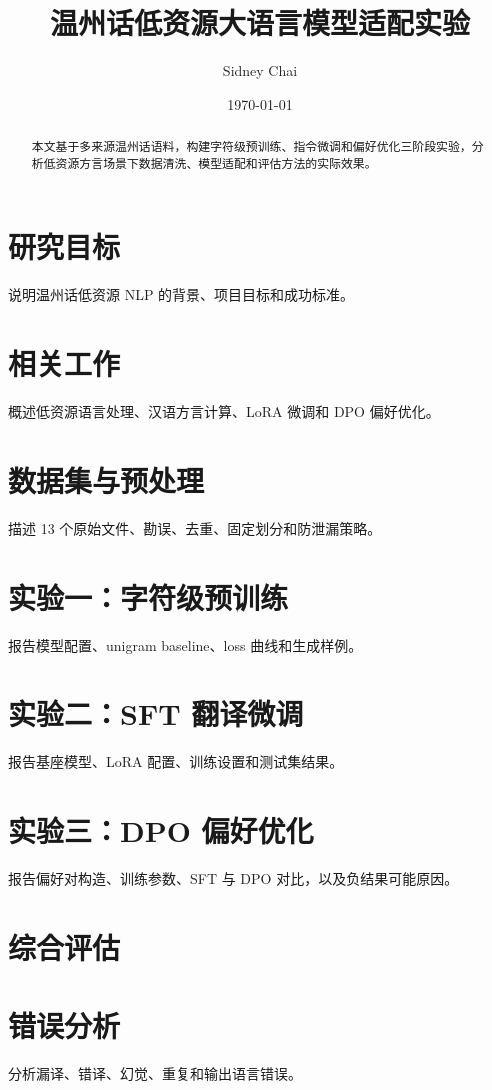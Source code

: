 \documentclass[UTF8,twocolumn]{ctexart}
\title{温州话低资源大语言模型适配实验}
\author{Sidney Chai}
\date{\today}
\begin{document}
\maketitle

\begin{abstract}
本文基于多来源温州话语料，构建字符级预训练、指令微调和偏好优化三阶段实验，分析低资源方言场景下数据清洗、模型适配和评估方法的实际效果。
\end{abstract}

\section{研究目标}
说明温州话低资源 NLP 的背景、项目目标和成功标准。

\section{相关工作}
概述低资源语言处理、汉语方言计算、LoRA 微调和 DPO 偏好优化。

\section{数据集与预处理}
描述 13 个原始文件、勘误、去重、固定划分和防泄漏策略。

\section{实验一：字符级预训练}
报告模型配置、unigram baseline、loss 曲线和生成样例。

\section{实验二：SFT 翻译微调}
报告基座模型、LoRA 配置、训练设置和测试集结果。

\section{实验三：DPO 偏好优化}
报告偏好对构造、训练参数、SFT 与 DPO 对比，以及负结果可能原因。

\section{综合评估}


\section{错误分析}
分析漏译、错译、幻觉、重复和输出语言错误。
\end{document}
